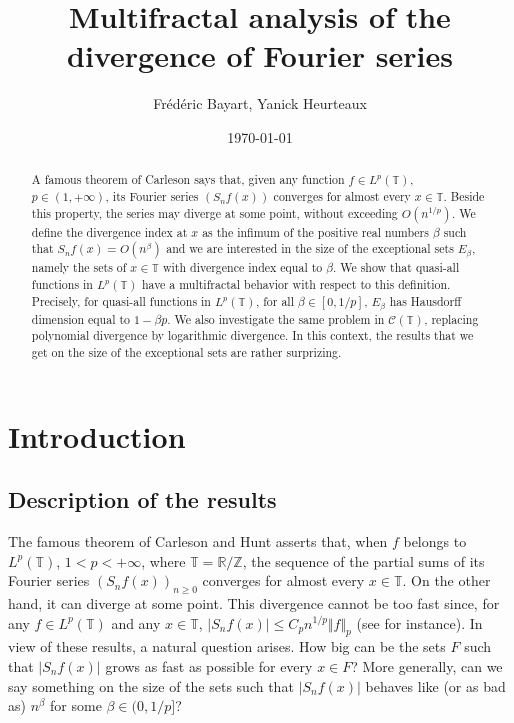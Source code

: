 \documentclass[11pt,a4paper]{amsart}
\date{\today}
\title{Multifractal analysis of the divergence of Fourier series}
\author{Fr\'ed\'eric Bayart, Yanick Heurteaux}
\theoremstyle{plain}
\begin{document}
\begin{abstract}
A famous theorem of Carleson says that, given any function $f\in L^p({\mathbb T})$, $p\in(1,+\infty)$, its 
Fourier series $(S_nf(x))$ converges for almost every $x\in \mathbb T$. Beside this property, the 
series may diverge at some point, without exceeding  $O(n^{1/p})$. 
We define the divergence index at $x$ as the infimum of the positive real numbers $\beta$ such that
$S_nf(x)=O(n^\beta)$ and we are interested in the size of the exceptional sets $E_\beta$, namely the sets of $x\in\mathbb T$ with divergence index equal to $\beta$. We show that quasi-all functions in $L^p({\mathbb T})$ have a multifractal behavior with respect to this definition.  Precisely, for quasi-all functions in $L^p(\mathbb T)$, for all $\beta\in[0,1/p]$, $E_\beta$ has
 Hausdorff dimension equal to $1-\beta p$.
We also investigate the same problem in $\mathcal C(\mathbb T)$, replacing polynomial divergence by
logarithmic divergence. In this context, the results that we get on the size of the exceptional sets 
are rather surprizing.\\
\end{abstract}

\maketitle

\section{Introduction}
\subsection{Description of the results}
The famous theorem of Carleson and Hunt asserts that, when $f$ belongs to $L^p(\mathbb T)$, $1<p<+\infty$,
where $\mathbb T=\mathbb R/\mathbb Z$, the sequence of the partial sums of its Fourier series $(S_nf(x))_{n\geq 0}$ 
converges for almost every $x\in\mathbb T$. On the other hand, it can diverge at some point. This divergence cannot be too 
fast since, for any $f\in L^p(\mathbb T)$ and any $x\in\mathbb T$, $|S_n
f(x)|\leq C_p n^{1/p}\Vert f\Vert_p$ (see \cite{Zyg} for instance). In view of these results, a natural question arises. How big can be the sets $F$ such that $|S_nf(x)|$ grows as fast
as possible for every $x\in F$? More generally, can we say something on the size of the sets such that $|S_nf(x)|$
behaves like (or as bad as) $n^{\beta}$ for some $\beta\in(0,1/p]$?
\end{document}
